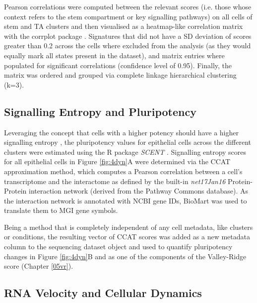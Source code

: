 Pearson correlations were computed between the relevant scores (i.e. those whose context refers to the stem compartment or key signalling pathways) on all cells of stem and TA clusters and then visualised as a heatmap-like correlation matrix with the corrplot package \cite{wei_r_2021}. Signatures that did not have a SD deviation of scores greater than 0.2 across the cells where excluded from the analysis (as they would equally mark all states present in the dataset), and matrix entries where populated for significant correlations (confidence level of 0.95). Finally, the matrix was ordered and grouped via complete linkage hierarchical clustering (k=3). 


\subsection{Signalling Entropy and Pluripotency}

Leveraging the concept that cells with a higher potency should have a higher signalling entropy \cite{teschendorff_signalling_2014}, the pluripotency values for epithelial cells across the different clusters were estimated using the R package \textit{SCENT} \cite{teschendorff_single-cell_2017}. 
Signalling entropy scores for all epithelial cells in Figure \ref{fig:4dyn}A were determined via the CCAT approximation method, which computes a Pearson correlation between a cell's transcriptome and the interactome as defined by the built-in \textit{net17Jan16} Protein-Protein interaction network (derived from the Pathway Commons database). As the interaction network is annotated with NCBI gene IDs, BioMart was used to translate them to MGI gene symbols.

Being a method that is completely independent of any cell metadata, like clusters or conditions, the resulting vector of CCAT scores was added as a new metadata column to the sequencing dataset object and used to quantify pluripotency changes in Figure \ref{fig:4dyn}B and as one of the components of the Valley-Ridge score (Chapter \ref{05vr}).


\subsection{RNA Velocity and Cellular Dynamics}

